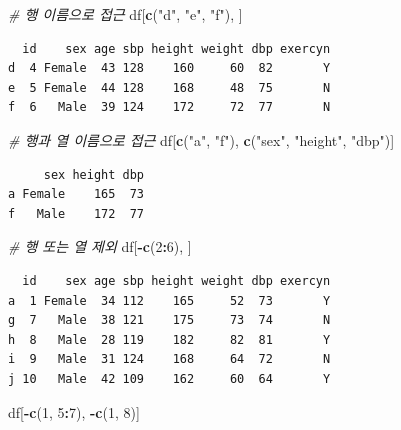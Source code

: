\documentclass[
  11pt,
]{krantz}
\newenvironment{Shaded}{\begin{snugshade}}{\end{snugshade}}
\newcommand{\CommentTok}[1]{\textcolor[rgb]{0.37,0.37,0.37}{\textit{#1}}}
\newcommand{\DecValTok}[1]{\textcolor[rgb]{0.06,0.06,0.06}{#1}}
\newcommand{\KeywordTok}[1]{\textcolor[rgb]{0.27,0.27,0.27}{\textbf{#1}}}
\newcommand{\NormalTok}[1]{#1}
\newcommand{\OperatorTok}[1]{\textcolor[rgb]{0.43,0.43,0.43}{\textbf{#1}}}
\newcommand{\StringTok}[1]{\textcolor[rgb]{0.5,0.5,0.5}{#1}}
\begin{document}
\begin{Shaded}
\begin{Highlighting}[]
\CommentTok{# 행 이름으로 접근}
\NormalTok{df[}\KeywordTok{c}\NormalTok{(}\StringTok{"d"}\NormalTok{, }\StringTok{"e"}\NormalTok{, }\StringTok{"f"}\NormalTok{), ]}
\end{Highlighting}
\end{Shaded}

\begin{verbatim}
  id    sex age sbp height weight dbp exercyn
d  4 Female  43 128    160     60  82       Y
e  5 Female  44 128    168     48  75       N
f  6   Male  39 124    172     72  77       N
\end{verbatim}

\begin{Shaded}
\begin{Highlighting}[]
\CommentTok{# 행과 열 이름으로 접근}
\NormalTok{df[}\KeywordTok{c}\NormalTok{(}\StringTok{"a"}\NormalTok{, }\StringTok{"f"}\NormalTok{), }\KeywordTok{c}\NormalTok{(}\StringTok{"sex"}\NormalTok{, }\StringTok{"height"}\NormalTok{, }\StringTok{"dbp"}\NormalTok{)]}
\end{Highlighting}
\end{Shaded}

\begin{verbatim}
     sex height dbp
a Female    165  73
f   Male    172  77
\end{verbatim}

\begin{Shaded}
\begin{Highlighting}[]
\CommentTok{# 행 또는 열 제외}
\NormalTok{df[}\OperatorTok{-}\KeywordTok{c}\NormalTok{(}\DecValTok{2}\OperatorTok{:}\DecValTok{6}\NormalTok{), ]}
\end{Highlighting}
\end{Shaded}

\begin{verbatim}
  id    sex age sbp height weight dbp exercyn
a  1 Female  34 112    165     52  73       Y
g  7   Male  38 121    175     73  74       N
h  8   Male  28 119    182     82  81       Y
i  9   Male  31 124    168     64  72       N
j 10   Male  42 109    162     60  64       Y
\end{verbatim}

\begin{Shaded}
\begin{Highlighting}[]
\NormalTok{df[}\OperatorTok{-}\KeywordTok{c}\NormalTok{(}\DecValTok{1}\NormalTok{, }\DecValTok{5}\OperatorTok{:}\DecValTok{7}\NormalTok{), }\OperatorTok{-}\KeywordTok{c}\NormalTok{(}\DecValTok{1}\NormalTok{, }\DecValTok{8}\NormalTok{)]}
\end{Highlighting}
\end{Shaded}
\end{document}
